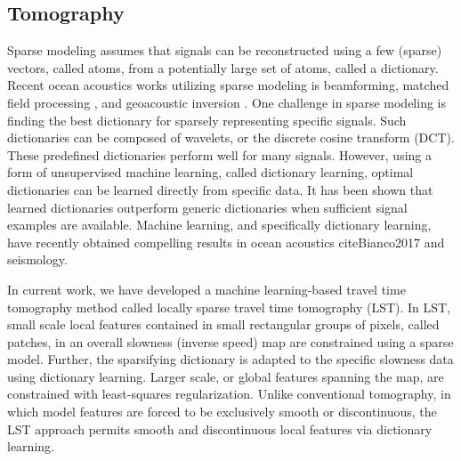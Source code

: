 \subsection{Tomography}
Sparse modeling assumes that signals can be reconstructed using a few (sparse) vectors, called atoms, from a potentially large set of atoms, called a dictionary. Recent ocean acoustics works utilizing sparse modeling is beamforming\cite{Xenaki2014}, matched field processing \cite{Gemba2017}, and geoacoustic inversion \cite{gerstoft2018}. One challenge in sparse modeling is finding the best dictionary for sparsely representing specific signals. Such dictionaries can be composed of wavelets, or the discrete cosine transform (DCT). These predefined dictionaries perform well for many signals. However, using a form of unsupervised machine learning, called dictionary learning, optimal dictionaries can be learned directly from specific data\cite{mallat1999}. It has been shown that learned dictionaries outperform generic dictionaries when sufficient signal examples are available. Machine learning, and specifically dictionary learning, have recently obtained compelling results in ocean acoustics cite{Bianco2017} and seismology\cite{kong2018}. 

In current work, we have developed a machine learning-based travel time tomography method called locally sparse travel time tomography (LST)\cite{bianco2018}. In LST, small scale local features contained in small rectangular groups of pixels, called patches, in an overall slowness (inverse  speed) map are constrained using a sparse model. Further, the sparsifying dictionary is adapted to the specific slowness data using dictionary learning. Larger scale, or global features spanning the  map, are constrained with least-squares regularization. Unlike conventional tomography, in which model features are forced to be exclusively smooth or discontinuous, the LST approach permits smooth and discontinuous local features via dictionary learning. 


